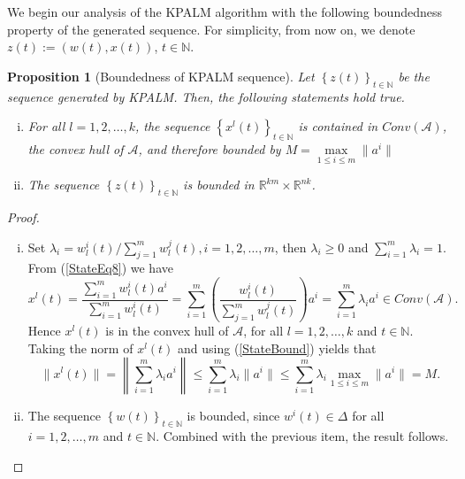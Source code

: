 \documentclass[11pt]{article}
\numberwithin{equation}{section}
\newtheorem{proposition}{Proposition}[section]
\begin{document}
We begin our analysis of the KPALM algorithm with the following boundedness property of the generated sequence. For simplicity, from now on, we denote $z(t):=\left( w(t),x(t) \right)$, $t \in \mathbb{N}$.
\begin{proposition}[Boundedness of KPALM sequence]
Let $\left\lbrace z(t) \right\rbrace_{t \in \mathbb{N}}$ be the sequence generated by KPALM. Then, the following statements hold true.
\begin{enumerate}[(i)]
	\item For all $l=1, 2, \ldots ,k$, the sequence $\left\lbrace x^l(t) \right\rbrace_{t \in \mathbb{N}}$ is contained in $Conv(\mathcal{A})$, the convex hull of $\mathcal{A}$, and therefore bounded by $M = \max\limits_{1 \leq i \leq m} \| a^i \|$
	\item The sequence $\left\lbrace z(t) \right\rbrace_{t \in \mathbb{N}}$ is bounded in $\mathbb{R}^{km} \times \mathbb{R}^{nk}$.
\end{enumerate}
\end{proposition}

\begin{proof}
\begin{enumerate}[(i)]
	\item  Set $\lambda_i = w^i_l(t)/\sum\limits_{j=1}^{m} w^j_l(t), i=1, 2, \ldots ,m$, then $\lambda_i \geq 0$ and $\sum\limits_{i=1}^{m} \lambda_i = 1$. From (\ref{StateEq8}) we have
	\begin{equation}
		x^l(t) = \frac{\sum_{i=1}^{m} w^i_l(t) a^i}{\sum_{i=1}^{m} w^i_l(t)} 
		= \sum_{i=1}^{m} \left( \frac{ w^i_l(t)}{\sum_{j=1}^{m} w^j_l(t)} \right) a^i 
		= \sum\limits_{i=1}^{m} \lambda_i a^i \in Conv(\mathcal{A}). \label{StateBound}
	\end{equation}
	Hence $x^l(t)$ is in the convex hull of $\mathcal{A}$, for all $l = 1, 2, \ldots, k$ and $t \in \mathbb{N}$. Taking the norm of $x^l(t)$ and using (\ref{StateBound}) yields that
	\begin{equation*}
		\| x^l(t) \| = \left\lVert \sum_{i=1}^{m} \lambda_i a^i \right\lVert
		\leq \sum_{i=1}^{m} \lambda_i \| a^i \|
		\leq \sum_{i=1}^{m} \lambda_i \max\limits_{1 \leq i \leq m} \| a^i \| = M .
	\end{equation*}
	\item The sequence $\left\lbrace w(t) \right\rbrace_{t \in \mathbb{N}}$ is bounded, since $w^i(t) \in \Delta$ for all $i=1, 2, \ldots ,m$ and $t \in \mathbb{N}$. Combined with the previous item, the result follows.
\end{enumerate} 
\end{proof}
\end{document}
